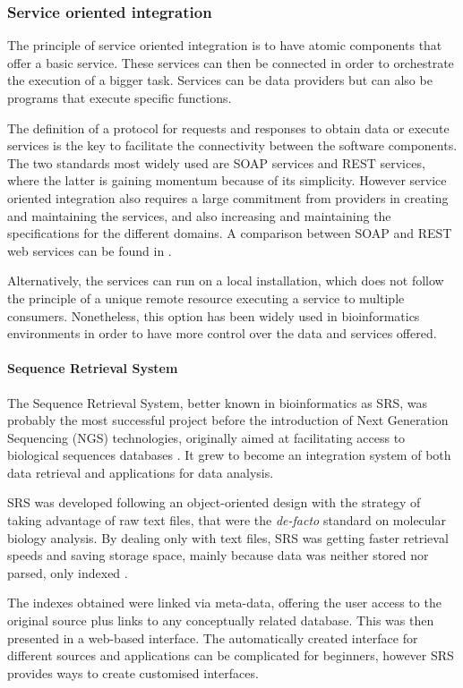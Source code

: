 \subsubsection{Service oriented integration} 
The principle of service oriented integration is to have atomic components that offer a basic service. These services can then be connected in order to orchestrate the execution of a bigger task. Services can be data providers but can also be programs that execute specific functions.

The definition of a protocol for requests and responses to obtain data or execute services is the key to facilitate the connectivity between the software components. The two standards most widely used are SOAP services and REST services, where the latter is gaining momentum because of its simplicity. However service oriented integration also requires a large commitment from providers in creating and maintaining the services, and also increasing and maintaining the specifications for the different domains. A comparison between SOAP and REST web services can be found in \cite{PAU2008}.

Alternatively, the services can run on a local installation, which does not follow the principle of a unique remote resource executing a service to multiple consumers. Nonetheless, this option has been widely used in bioinformatics environments in order to have more control over the data and services offered.

\paragraph{Sequence Retrieval System}

The Sequence Retrieval System, better known in bioinformatics as SRS, was probably the most successful project before the introduction of Next Generation Sequencing (NGS) technologies, originally aimed at facilitating access to biological sequences databases \cite{ETZ1996}. It grew to become an integration system of both data retrieval and applications for data analysis.

SRS was developed following an object-oriented design with the strategy of taking advantage of raw text files, that were the \emph{de-facto} standard on molecular biology analysis. By dealing only with text files, SRS was getting faster retrieval speeds and saving storage space, mainly because data was neither stored nor parsed, only indexed \cite{ZDO2002}.

The  indexes obtained were linked via meta-data, offering the user access to the original source plus links to any conceptually related database. This was then presented in a web-based interface. The automatically created interface for different sources and applications can be complicated for beginners, however SRS provides ways to create customised interfaces.

